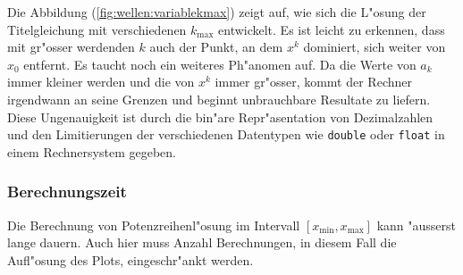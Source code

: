 Die Abbildung (\ref{fig:wellen:variablekmax}) zeigt auf, wie sich die L"osung 
der Titelgleichung mit verschiedenen $k_{\text{max}}$ entwickelt. Es ist leicht 
zu erkennen, dass mit gr"osser werdenden $k$ auch der Punkt, an dem $x^k$ 
dominiert, sich weiter von $x_0$ entfernt. Es taucht noch ein weiteres 
Ph"anomen auf. Da die Werte von $a_k$ immer kleiner werden und die von 
$x^k$ immer gr"osser, kommt der Rechner irgendwann an seine Grenzen und beginnt 
unbrauchbare Resultate zu liefern. Diese Ungenauigkeit ist durch die bin"are 
Repr"asentation von Dezimalzahlen und den Limitierungen der verschiedenen 
Datentypen wie \texttt{double} oder \texttt{float} in einem Rechnersystem 
gegeben.

\subsubsection{Berechnungszeit}
Die Berechnung von Potenzreihenl"osung im Intervall
$[x_{\text{min}},x_{\text{max}}]$ kann "ausserst lange dauern. Auch hier muss 
Anzahl Berechnungen, in diesem Fall die Aufl"osung des Plots, eingeschr"ankt 
werden. 



